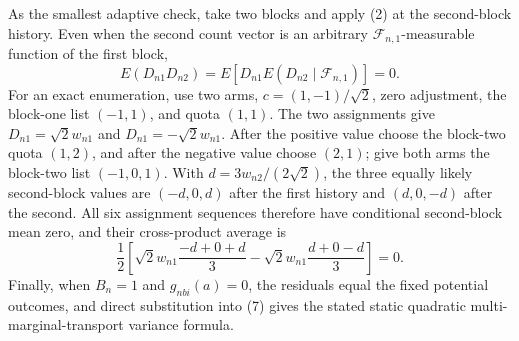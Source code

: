 As the smallest adaptive check, take two blocks and apply (2) at the second-block history. Even when the second count vector is an arbitrary \(\mathcal F_{n,1}\)-measurable function of the first block,
\[
E(D_{n1}D_{n2})=E\!\left[D_{n1}E(D_{n2}\mid\mathcal F_{n,1})\right]=0.
\tag{10}
\]
For an exact enumeration, use two arms, \(c=(1,-1)/\sqrt2\), zero adjustment, the block-one list \((-1,1)\), and quota \((1,1)\). The two assignments give \(D_{n1}=\sqrt2w_{n1}\) and \(D_{n1}=-\sqrt2w_{n1}\). After the positive value choose the block-two quota \((1,2)\), and after the negative value choose \((2,1)\); give both arms the block-two list \((-1,0,1)\). With \(d=3w_{n2}/(2\sqrt2)\), the three equally likely second-block values are \((-d,0,d)\) after the first history and \((d,0,-d)\) after the second. All six assignment sequences therefore have conditional second-block mean zero, and their cross-product average is
\[
\frac12\left[\sqrt2w_{n1}\frac{-d+0+d}{3}
-\sqrt2w_{n1}\frac{d+0-d}{3}\right]=0.
\tag{11}
\]
Finally, when \(B_n=1\) and \(g_{nbi}(a)=0\), the residuals equal the fixed potential outcomes, and direct substitution into (7) gives the stated static quadratic multi-marginal-transport variance formula.